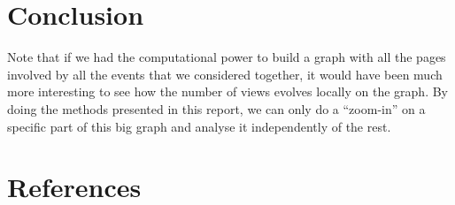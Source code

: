\documentclass[conference]{IEEEtran}
\begin{document}
\section{Conclusion}

Note that if we had the computational power to build a graph with all the pages involved by all the events that we considered together, it would have been much more interesting to see how the number of views evolves locally on the graph. By doing the methods presented in this report, we can only do a “zoom-in” on a specific part of this big graph and analyse it independently of the rest. 


\section*{References}


\cite{laplacian}  
\cite{signalprocessing}
\cite{clustering}



\end{document}
